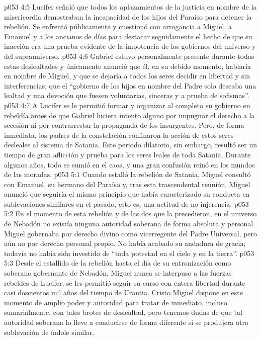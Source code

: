 \vs p053 4:5 \pc Lucifer señaló que todos los aplazamientos de la justicia en nombre de la misericordia demostraban la incapacidad de los hijos del Paraíso para detener la rebelión. Se enfrentó públicamente y cuestionó con arrogancia a Miguel, a Emanuel y a los ancianos de días para destacar seguidamente el hecho de que su inacción era una prueba evidente de la impotencia de los gobiernos del universo y del suprauniverso.
\vs p053 4:6 Gabriel estuvo personalmente presente durante todas estas deslealtades y únicamente anunció que él, en su debido momento, hablaría en nombre de Miguel, y que se dejaría a todos los seres decidir en libertad y sin interferencias; que el “gobierno de los hijos en nombre del Padre solo deseaba una lealtad y una devoción que fuesen voluntarias, sinceras y a prueba de sofismas”.
\vs p053 4:7 \pc A Lucifer se le permitió formar y organizar al completo su gobierno en rebeldía antes de que Gabriel hiciera intento alguno por impugnar el derecho a la secesión ni por contrarrestar la propaganda de los insurgentes. Pero, de forma inmediata, los padres de la constelación confinaron la acción de estos seres desleales al sistema de Satania. Este periodo dilatorio, sin embargo, resultó ser un tiempo de gran aflicción y prueba para los seres leales de toda Satania. Durante algunos años, todo se sumió en el caos, y una gran confusión reinó en los mundos de las moradas.
\vs p053 5:1 Cuando estalló la rebelión de Satania, Miguel consultó con Emanuel, su hermano del Paraíso y, tras esta trascendental reunión, Miguel anunció que seguiría el mismo principio que había caracterizado su conducta en sublevaciones similares en el pasado, esto es, una actitud de no injerencia.
\vs p053 5:2 \pc En el momento de esta rebelión y de las dos que la precedieron, en el universo de Nebadón no existía ninguna autoridad soberana de forma absoluta y personal. Miguel gobernaba por derecho divino como vicerregente del Padre Universal, pero aún no por derecho personal propio. No había acabado su andadura de gracia; todavía no había sido investido de “toda potestad en el cielo y en la tierra”.
\vs p053 5:3 Desde el estallido de la rebelión hasta el día de su entronización como soberano gobernante de Nebadón, Miguel nunca se interpuso a las fuerzas rebeldes de Lucifer; se les permitió seguir su curso con entera libertad durante casi doscientos mil años del tiempo de Urantia. Cristo Miguel dispone en este momento de amplio poder y autoridad para tratar de inmediato, incluso sumarialmente, con tales brotes de deslealtad, pero tenemos dudas de que tal autoridad soberana lo lleve a conducirse de forma diferente si se produjera otra sublevación de índole similar.
